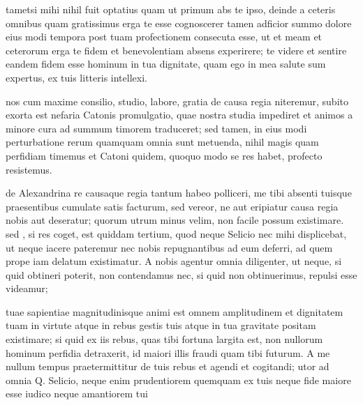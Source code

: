 


 tametsi mihi nihil fuit optatius quam ut primum abs te ipso, deinde a ceteris omnibus quam gratissimus erga te esse cognoscerer tamen adficior summo dolore eius modi tempora post tuam profectionem consecuta esse, ut et meam et ceterorum erga te fidem et benevolentiam absens experirere; te videre et sentire eandem fidem esse hominum in tua dignitate, quam ego in mea salute sum expertus, ex tuis litteris intellexi.

 nos cum maxime consilio, studio, labore, gratia de causa regia niteremur, subito exorta est nefaria Catonis promulgatio, quae nostra studia impediret et animos a minore cura ad summum timorem traduceret; sed tamen, in eius modi perturbatione rerum quamquam omnia sunt metuenda, nihil magis quam perfidiam timemus et Catoni quidem, quoquo modo se res habet, profecto resistemus.

 de Alexandrina re causaque regia tantum habeo polliceri, me tibi absenti tuisque praesentibus cumulate satis facturum, sed vereor, ne aut eripiatur causa regia nobis aut deseratur; quorum utrum minus velim, non facile possum existimare. sed , si res coget, est quiddam tertium, quod neque Selicio nec mihi displicebat, ut neque iacere pateremur nec nobis repugnantibus ad eum deferri, ad quem prope iam delatum existimatur. A nobis agentur omnia diligenter, ut neque, si quid obtineri poterit, non contendamus nec, si quid non obtinuerimus, repulsi esse videamur;

 tuae sapientiae magnitudinisque animi est omnem amplitudinem et dignitatem tuam in virtute atque in rebus gestis tuis atque in tua gravitate positam existimare; si quid ex iis rebus, quas tibi fortuna largita est, non nullorum hominum perfidia detraxerit, id maiori illis fraudi quam tibi futurum. A me nullum tempus praetermittitur de tuis rebus et agendi et cogitandi; utor ad omnia Q. Selicio, neque enim prudentiorem quemquam ex tuis neque fide maiore esse iudico neque amantiorem tui
